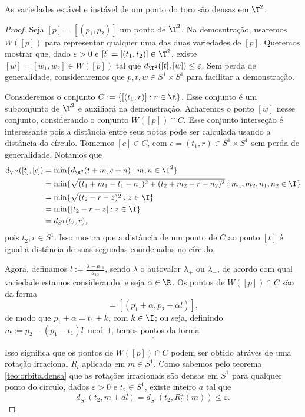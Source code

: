 \begin{proposition}
As variedades estável e instável de um ponto do toro são densas em $\T^2$.	\end{proposition}
\begin{proof}
Seja $[p]=[(p_1,p_2)]$ um ponto de $\T^2$. Na demosntração, usaremos $W([p])$ para representar qualquer uma das duas variedades de $[p]$. Queremos mostrar que, dado $\varepsilon > 0$ e $[t]=[(t_1,t_2)] \in \T^2$, existe $[w]=[w_1,w_2] \in W([p])$ tal que $d_{\T^2}([t],[w]) \leq \varepsilon$. Sem perda de generalidade, consideraremos que $p,t,w \in S^1 \times S^1$ para facilitar a demonstração.

Consideremos o conjunto $C := \{[(t_1,r)] : r \in \R \}$. Esse conjunto é um subconjunto de $\T^2$ e auxiliará na demonstração. Acharemos o ponto $[w]$ nesse conjunto, considerando o conjunto $W([p]) \cap C$. Esse conjunto interseção é interessante pois a distância entre seus potos pode ser calculada usando a distância do círculo. Tomemos $[c] \in C$, com $c=(t_1,r) \in S^1 \times S^1$ sem perda de generalidade. Notamos que
	\begin{align*}
		d_{\T^2}([t],[c])& = \min\{ d_{\R^2}(t+m,c+n) : m,n \in \I^2 \} \\
			& = \min\{ \sqrt{(t_1+m_1-t_1-n_1)^2 + (t_2+m_2-r-n_2)^2} : m_1,m_2,n_1,n_2 \in \I \} \\
			& = \min\{ \sqrt{(t_2-r-z)^2} : z \in \I \} \\
			& = \min\{ |t_2-r-z| : z \in \I \} \\
			& = d_{S^1}(t_2,r),
	\end{align*}
pois $t_2, r \in S^1$. Isso mostra que a distância de um ponto de $C$ ao ponto $[t]$ é igual à distância de suas segundas coordenadas no círculo.

Agora, definamos $l := \frac{\lambda - a_{11}}{a_{12}}$, sendo $\lambda$ o autovalor $\lambda_+$ ou $\lambda_-$, de acordo com qual variedade estamos considerando, e seja $\alpha \in \R$. Os pontos de $W([p]) \cap C$ são da forma
	\begin{equation*}
	[p + \alpha v_\lambda] = [(p_1 + \alpha, p_2 + \alpha l)],
	\end{equation*}
de modo que $p_1 + \alpha = t_1 + k$, com $k \in \I$; ou seja, definindo $m := p_2 - (p_1 - t_1)l \bmod 1$, temos pontos da forma
	\begin{equation*}
	[(t_1,m + kl)].
	\end{equation*}

Isso significa que os pontos de $W([p]) \cap C$ podem ser obtido atráves de uma rotação irracional $R_l$ aplicada em $m \in S^1$. Como sabemos pelo teorema \ref{teo:orbita.densa} que as rotações irracionais são densas em $S^1$ para qualquer ponto do círculo, dados $\varepsilon > 0$ e $t_2 \in S^1$, existe inteiro $a$ tal que
	\begin{equation*}
	d_{S^1}(t_2,m + al) = d_{S^1}(t_2,R_l^a(m)) \leq \varepsilon \text{.}
	\end{equation*}


\end{proof}
